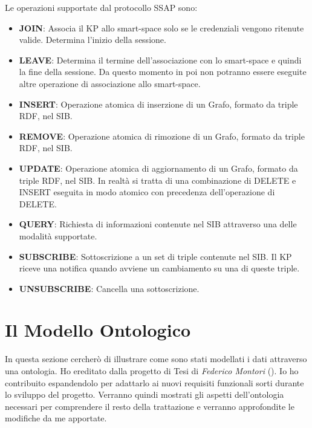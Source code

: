 Le operazioni supportate dal protocollo SSAP sono:

\begin{itemize}
	\item \textbf{JOIN}: Associa il KP allo smart-space solo se le credenziali vengono ritenute valide. Determina l'inizio della sessione.
	\item \textbf{LEAVE}: Determina il termine dell'associazione con lo smart-space e quindi la fine della sessione. Da questo momento in poi non potranno essere eseguite altre operazione di associazione allo smart-space.
	\item \textbf{INSERT}: Operazione atomica di inserzione di un Grafo, formato da triple RDF, nel SIB.
	\item \textbf{REMOVE}: Operazione atomica di rimozione di un Grafo, formato da triple RDF, nel SIB.
	\item \textbf{UPDATE}: Operazione atomica di aggiornamento di un Grafo, formato da triple RDF, nel SIB. In realtà si tratta di una combinazione di DELETE e INSERT eseguita in modo atomico con precedenza dell'operazione di DELETE.
	\item \textbf{QUERY}: Richiesta di informazioni contenute nel SIB attraverso una delle modalità supportate.
	\item \textbf{SUBSCRIBE}: Sottoscrizione a un set di triple contenute nel SIB. Il KP riceve una notifica quando avviene un cambiamento su una di queste triple.
	\item \textbf{UNSUBSCRIBE}: Cancella una sottoscrizione.
\end{itemize}


\section{Il Modello Ontologico}

In questa sezione cercherò di illustrare come sono stati modellati i dati attraverso una ontologia. Ho ereditato dalla progetto di Tesi di \emph{Federico Montori} (\cite{montori2012}). Io ho contribuito espandendolo per adattarlo ai nuovi requisiti funzionali sorti durante lo sviluppo del progetto. Verranno quindi mostrati gli aspetti dell'ontologia necessari per comprendere il resto della trattazione e verranno approfondite le modifiche da me apportate.

